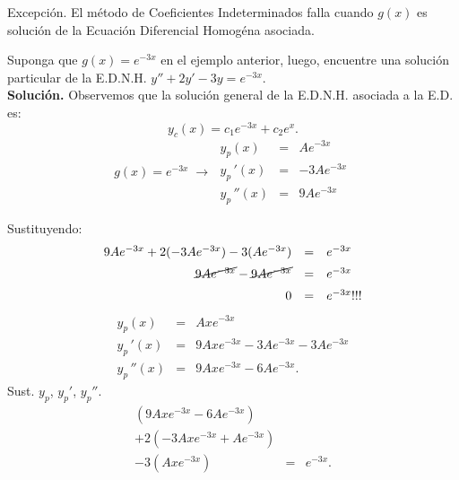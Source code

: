\documentclass[9pt]{beamer}
\begin{document}
\begin{frame}[t]
	\begin{block}{Excepción.}
		El método de Coeficientes Indeterminados falla cuando \(g(x)\) es solución de la Ecuación Diferencial Homogéna asociada.
	\end{block}
	\begin{example}
		Suponga que \(g(x) =e^{-3x}\) en el ejemplo anterior, luego, encuentre una solución particular de la E.D.N.H. \(y'' +2y' -3y=e^{-3x}\). \\[2mm]
		\textbf{Solución.} Observemos que la solución general de la E.D.N.H. asociada a la E.D. es: \vspace{-5mm}
		\[
			y_c(x) = c_1e^{-3x} +c_2e^x.
		\]
		\[
			g(x) = e^{-3x} \; \longrightarrow \; \begin{array}{rcl}
				y_p(x) & = & Ae^{-3x} \\[2mm]
				y_p\,' (x) & = & -3Ae^{-3x} \\[2mm]
				y_p\,'' (x) & = & 9Ae^{-3x}
			\end{array}
		\]
	\end{example}
\end{frame}

\begin{frame}[t]
	\begin{exampleblock}{}
		Sustituyendo:
		\[
			\begin{array}{rcl}
				9Ae^{-3x} + 2(-3Ae^{-3x}) -3(Ae^{-3x}) & = & e^{-3x} \\[2mm]
				\cancel{9Ae^{-3x}} - \cancel{9Ae^{-3x}} & = & e^{-3x} \\[2mm]
				0 & = & e^{-3x}!!!
			\end{array}
		\]
		\[
			\begin{array}{rcl}
				y_p(x) & = & Axe^{-3x} \\[2mm]
				y_p\,' (x) & = & 9Axe^{-3x} - 3Ae^{-3x} - 3Ae^{-3x} \\[2mm]
				y_p\,'' (x) & = & 9Axe^{-3x} - 6Ae^{-3x} .
			\end{array}
		\]
		Sust. \(y_p\), \(y_p'\), \(y_p''\). \vspace{-5mm}
		\[
			\begin{array}{rcl}
				(9Axe^{-3x} - 6Ae^{-3x}) && \\
				+2(-3Axe^{-3x} +Ae^{-3x}) && \\
				-3(Axe^{-3x}) & = & e^{-3x} .
			\end{array}
		\]
	\end{exampleblock}
\end{frame}
\end{document}
